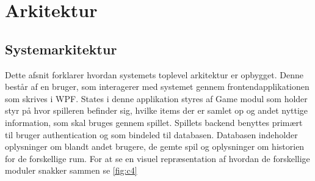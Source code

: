 \section{Arkitektur}

\subsection{Systemarkitektur}
\noindent
Dette afsnit forklarer hvordan systemets toplevel arkitektur er opbygget.
Denne består af en bruger, som interagerer med systemet gennem frontendapplikationen som skrives i WPF. 
States i denne applikation styres af Game modul som holder styr på hvor spilleren befinder sig, hvilke items der er samlet op og andet nyttige information, som skal bruges gennem spillet.
Spillets backend benyttes primært til bruger authentication og som bindeled til databasen.
Databasen indeholder oplysninger om blandt andet brugere, de gemte spil og oplysninger om historien for de forskellige rum.
For at se en visuel repræsentation af hvordan de forskellige moduler snakker sammen se \autoref{fig:c4}










